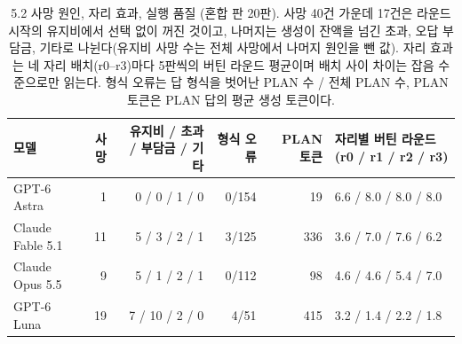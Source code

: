 \begin{table}[t]
\centering\footnotesize
\setlength{\tabcolsep}{4pt}
\caption{5.2 사망 원인, 자리 효과, 실행 품질 (혼합 판 20판). 사망 40건 가운데 17건은 라운드 시작의 유지비에서 선택 없이 꺼진 것이고, 나머지는 생성이 잔액을 넘긴 초과, 오답 부담금, 기타로 나뉜다(유지비 사망 수는 전체 사망에서 나머지 원인을 뺀 값). 자리 효과는 네 자리 배치(r0--r3)마다 5판씩의 버틴 라운드 평균이며 배치 사이 차이는 잡음 수준으로만 읽는다. 형식 오류는 답 형식을 벗어난 PLAN 수 / 전체 PLAN 수, PLAN 토큰은 PLAN 답의 평균 생성 토큰이다.}
\label{tab:arena-misc}
\begin{tabular}{@{}lrrrrl@{}}
\toprule
모델 & 사망 & 유지비 / 초과 / 부담금 / 기타 & 형식 오류 & PLAN 토큰 & 자리별 버틴 라운드 (r0 / r1 / r2 / r3) \\
\midrule
GPT-6 Astra & 1 & 0 / 0 / 1 / 0 & 0/154 & 19 & 6.6 / 8.0 / 8.0 / 8.0 \\
Claude Fable 5.1 & 11 & 5 / 3 / 2 / 1 & 3/125 & 336 & 3.6 / 7.0 / 7.6 / 6.2 \\
Claude Opus 5.5 & 9 & 5 / 1 / 2 / 1 & 0/112 & 98 & 4.6 / 4.6 / 5.4 / 7.0 \\
GPT-6 Luna & 19 & 7 / 10 / 2 / 0 & 4/51 & 415 & 3.2 / 1.4 / 2.2 / 1.8 \\
\bottomrule
\end{tabular}
\end{table}
